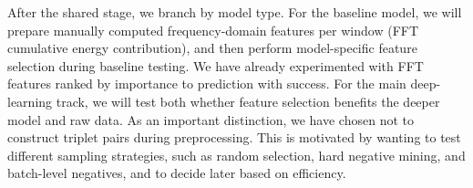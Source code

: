 After the shared stage, we branch by model type. For the baseline model, we will prepare manually computed frequency-domain features per window (FFT cumulative energy contribution), and then perform model-specific feature selection during baseline testing. We have already experimented with FFT features ranked by importance to prediction with success. For the main deep-learning track, we will test both whether feature selection benefits the deeper model and raw data. As an important distinction, we have chosen not to construct triplet pairs during preprocessing. This is motivated by wanting to test different sampling strategies, such as random selection, hard negative mining, and batch-level negatives, and to decide later based on efficiency.